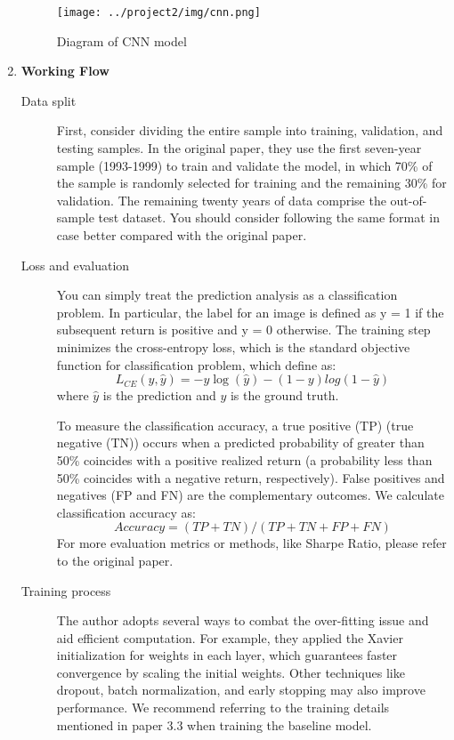 \documentclass[11pt]{article}
\begin{document}
\begin{enumerate}
    \begin{figure}
        \centering
        \texttt{[image: ../project2/img/cnn.png]}
        \caption{Diagram of CNN model}
        \label{cnn model}
    \end{figure}
    
    \item \textbf{Working Flow}
    
    \begin{description}
    \item[Data split] First, consider dividing the entire sample into training, validation, and testing samples. In the original paper, they use the first seven-year sample (1993-1999) to train and validate the model, in which 70\% of the sample is randomly selected for training and the remaining 30\% for validation. The remaining twenty years of data comprise the out-of-sample test dataset. You should consider following the same format in case better compared with the original paper.
    
    \item[Loss and evaluation] You can simply treat the prediction analysis as a classification problem. In particular, the label for an image is defined as y = 1 if the subsequent return is positive and y = 0 otherwise. The training step minimizes the cross-entropy loss, which is the standard objective function for classification problem, which define as:$$L_{CE}(y,\hat{y}) = -y\log(\hat{y}) - (1-y)log(1-\hat{y})$$ where $\hat{y}$ is the prediction and $y$ is the ground truth. 
    
    To measure the classification accuracy, a true positive (TP) (true negative (TN)) occurs when a predicted probability of greater than 50\% coincides with a positive realized return (a probability less than 50\% coincides with a negative return, respectively). False positives and negatives (FP and FN) are the complementary outcomes. We calculate classification accuracy as:$$Accuracy = (TP + TN)/(TP + TN + FP + FN)$$ For more evaluation metrics or methods, like Sharpe Ratio, please refer to the original paper.
    
    \item[Training process] The author adopts several ways to combat the over-fitting issue and aid efficient computation. For example, they applied the Xavier initialization for weights in each layer, which guarantees faster convergence by scaling the initial weights. Other techniques like dropout, batch normalization, and early stopping may also improve performance. We recommend referring to the training details mentioned in paper 3.3 when training the baseline model.


\end{description}
\end{enumerate}
\end{document}
